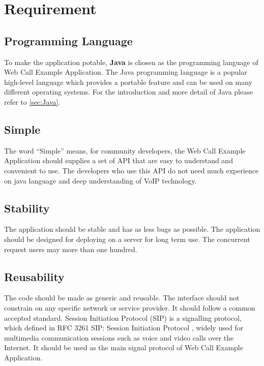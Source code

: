 \chapter{Requirement}
\label{sec:Requirement}


\section{Programming Language}
\label{sec:Requirement:ProgrammingLanguage}

To make the application potable, \textbf{Java} is chosen as the programming language of Web Call Example Application. The Java programming language is a popular high-level language which provides a portable feature and can be used on many different operating systems. For the introduction and more detail of Java please refer to \ref{sec:Java}.

\section{Simple}
\label{sec:Requirement:Simple}

The word ``Simple'' means, for community developers, the Web Call Example Application should supplies a set of API that are easy to understand and convenient to use. The developers who use this API do not need much experience on java language and deep understanding of VoIP technology.

\section{Stability}
\label{sec:Requirement:Stability}

The application should be stable and has as less bugs as possible. The application should be designed for deploying on a server for long term use. The concurrent request users may more than one hundred. 

\section{Reusability}
\label{sec:Requirement:Reusability}

The code should be made as generic and reusable. The interface should not constrain on any specific network or service provider. It should follow a common accepted standard. Session Initiation Protocol (SIP) is a signalling protocol, which defined in RFC 3261 SIP: Session Initiation Protocol \cite{RFC3261}, widely used for multimedia communication sessions such as voice and video calls over the Internet. It should be used as the main signal protocol of Web Call Example Application.

